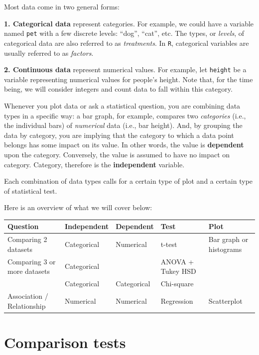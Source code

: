 \documentclass[
]{book}
\begin{document}
Most data come in two general forms:

\textbf{1. Categorical data} represent categories. For example, we could have a variable named \texttt{pet} with a few discrete levels: ``dog'', ``cat'', etc. The types, or \emph{levels}, of categorical data are also referred to as \emph{treatments}. In \texttt{R}, categorical variables are usually referred to as \emph{factors}.

\textbf{2. Continuous data} represent numerical values. For example, let \texttt{height} be a variable representing numerical values for people's height. Note that, for the time being, we will consider integers and count data to fall within this category.

Whenever you plot data or ask a statistical question, you are combining data types in a specific way: a bar graph, for example, compares two \emph{categories} (i.e., the individual bars) of \emph{numerical} data (i.e., bar height). And, by grouping the data by category, you are implying that the category to which a data point belongs has some impact on its value. In other words, the value is \textbf{dependent} upon the category. Conversely, the value is assumed to have no impact on category. Category, therefore is the \textbf{independent} variable.

Each combination of data types calls for a certain type of plot and a certain type of statistical test.

Here is an overview of what we will cover below:

\begin{tabular}{l|l|l|l|l}
\hline
Question & Independent & Dependent & Test & Plot\\
\hline
Comparing 2 datasets & Categorical & Numerical & t-test & Bar graph or histograms\\
\hline
Comparing 3 or more datasets & Categorical &  & ANOVA + Tukey HSD & \\
\hline
 & Categorical & Categorical & Chi-square & \\
\hline
Association / Relationship & Numerical & Numerical & Regression & Scatterplot\\
\hline
\end{tabular}

\hypertarget{comparison-tests}{%
\section*{Comparison tests}\label{comparison-tests}}
\end{document}
